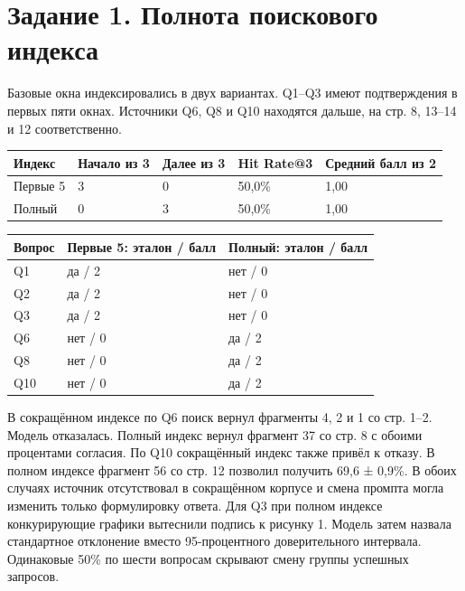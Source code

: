 \documentclass[12pt,a4paper]{article}
\begin{document}
\hypertarget{ux437ux430ux434ux430ux43dux438ux435-1.-ux43fux43eux43bux43dux43eux442ux430-ux43fux43eux438ux441ux43aux43eux432ux43eux433ux43e-ux438ux43dux434ux435ux43aux441ux430}{%
\section{Задание 1. Полнота поискового
индекса}\label{ux437ux430ux434ux430ux43dux438ux435-1.-ux43fux43eux43bux43dux43eux442ux430-ux43fux43eux438ux441ux43aux43eux432ux43eux433ux43e-ux438ux43dux434ux435ux43aux441ux430}}

Базовые окна индексировались в двух вариантах. Q1--Q3 имеют
подтверждения в первых пяти окнах. Источники Q6, Q8 и Q10 находятся
дальше, на стр. 8, 13--14 и 12 соответственно.

\begin{longtable}[]{@{}lllll@{}}
\toprule\noalign{}
Индекс & Начало из 3 & Далее из 3 & Hit Rate@3 & Средний балл из 2 \\
\midrule\noalign{}
\endhead
\bottomrule\noalign{}
\endlastfoot
Первые 5 & 3 & 0 & 50,0\% & 1,00 \\
Полный & 0 & 3 & 50,0\% & 1,00 \\
\end{longtable}

\begin{longtable}[]{@{}lll@{}}
\toprule\noalign{}
Вопрос & Первые 5: эталон / балл & Полный: эталон / балл \\
\midrule\noalign{}
\endhead
\bottomrule\noalign{}
\endlastfoot
Q1 & да / 2 & нет / 0 \\
Q2 & да / 2 & нет / 0 \\
Q3 & да / 2 & нет / 0 \\
Q6 & нет / 0 & да / 2 \\
Q8 & нет / 0 & да / 2 \\
Q10 & нет / 0 & да / 2 \\
\end{longtable}

В сокращённом индексе по Q6 поиск вернул фрагменты 4, 2 и 1 со стр.
1--2. Модель отказалась. Полный индекс вернул фрагмент 37 со стр. 8 с
обоими процентами согласия. По Q10 сокращённый индекс также привёл к
отказу. В полном индексе фрагмент 56 со стр. 12 позволил получить 69,6 ±
0,9\%. В обоих случаях источник отсутствовал в сокращённом корпусе и
смена промпта могла изменить только формулировку ответа. Для Q3 при
полном индексе конкурирующие графики вытеснили подпись к рисунку 1.
Модель затем назвала стандартное отклонение вместо 95-процентного
доверительного интервала. Одинаковые 50\% по шести вопросам скрывают
смену группы успешных запросов.
\end{document}
